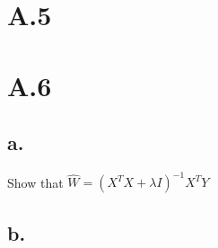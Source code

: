 \documentclass{article}
\newcommand{\1}{\mathbf{1}}
\begin{document}
\section*{A.5}
{\Large 



}

\section*{A.6}
{\Large 

\subsection*{a.}

Show that $\widehat{W} = (X^TX + \lambda I)^{-1}X^TY$

\subsection*{b.}

}
\end{document}

